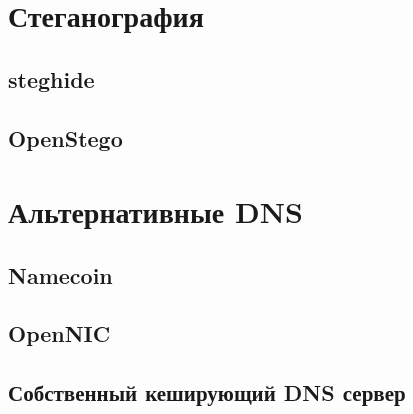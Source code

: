 \section{Стеганография}
\subsection{steghide}
\subsection{OpenStego}

\section{Альтернативные DNS}
\subsection{Namecoin}
\subsection{OpenNIC}
\subsection{Собственный кеширующий DNS сервер}
